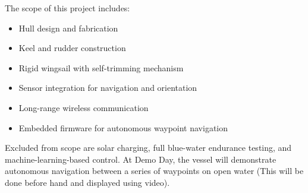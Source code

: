 The scope of this project includes:
\begin{itemize}
    \item Hull design and fabrication
    \item Keel and rudder construction
    \item Rigid wingsail with self-trimming mechanism
    \item Sensor integration for navigation and orientation
    \item Long-range wireless communication
    \item Embedded firmware for autonomous waypoint navigation
\end{itemize}
Excluded from scope are solar charging, full blue-water endurance testing, and machine-learning-based control. At Demo Day, the vessel will demonstrate autonomous navigation between a series of waypoints on open water (This will be done before hand and displayed using video).

